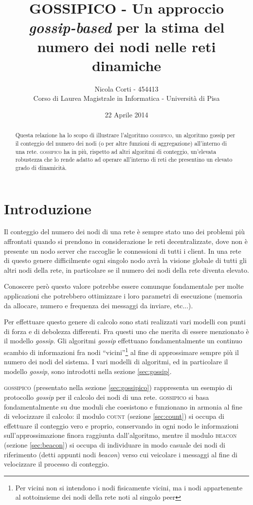 \documentclass[a4paper,12pt]{article}
\title{GOSSIPICO - Un approccio \emph{gossip-based} per la stima del numero dei nodi nelle reti dinamiche}
\author{Nicola Corti - 454413 \\Corso di Laurea Magistrale in Informatica - Universit\`a di Pisa}
\date{22 Aprile 2014}
\begin{document}
\maketitle

\begin{abstract}
Questa relazione ha lo scopo di illustrare l'algoritmo \textsc{gossipico}, un algoritmo gossip per il conteggio del numero dei nodi (o per altre funzioni di aggregazione) all'interno di una rete. \textsc{gossipico} ha in pi\`u, rispetto ad altri algoritmi di conteggio, un'elevata robustezza che lo rende adatto ad operare all'interno di reti che presentino un elevato grado di dinamicit\`a.
\end{abstract}

\tableofcontents

\section*{Introduzione}

Il conteggio del numero dei nodi di una rete \`e sempre stato uno dei problemi pi\`u affrontati quando si prendono in considerazione le reti decentralizzate, dove non \`e presente un nodo server che raccoglie le connessioni di tutti i client. In una rete di questo genere difficilmente ogni singolo nodo avr\`a la visione globale di tutti gli altri nodi della rete, in particolare se il numero dei nodi della rete diventa elevato.

Conoscere per\`o questo valore potrebbe essere comunque fondamentale per molte applicazioni che potrebbero ottimizzare i loro parametri di esecuzione (memoria da allocare, numero e frequenza dei messaggi da inviare, etc...).

Per effettuare questo genere di calcolo sono stati realizzati vari modelli con punti di forza e di debolezza differenti. Fra questi uno che merita di essere menzionato \`e il modello \emph{gossip}. Gli algoritmi \emph{gossip} effettuano fondamentalmente un continuo scambio di informazioni fra nodi ``vicini''\footnote{Per vicini non si intendono i nodi fisicamente vicini, ma i nodi appartenente al sottoinsieme dei nodi della rete noti al singolo peer} al fine di approssimare sempre pi\`u il numero dei nodi del sistema. I vari modelli di algoritmi, ed in particolare il modello \emph{gossip}, sono introdotti nella sezione \ref{sec:gossip}.

\textsc{gossipico} (presentato nella sezione \ref{sec:gossipico}) rappresenta un esempio di protocollo \emph{gossip} per il calcolo dei nodi di una rete. \textsc{gossipico} si basa fondamentalmente su due moduli che coesistono e funzionano in armonia al fine di velocizzare il calcolo: il modulo \textsc{count} (sezione \ref{sec:count}) si occupa di effettuare il conteggio vero e proprio, conservando in ogni nodo le informazioni sull'approssimazione finora raggiunta dall'algoritmo, mentre il modulo \textsc{beacon} (sezione \ref{sec:beacon}) si occupa di individuare in modo casuale dei nodi di riferimento (detti appunti nodi \emph{beacon}) verso cui veicolare i messaggi al fine di velocizzare il processo di conteggio.
\end{document}
